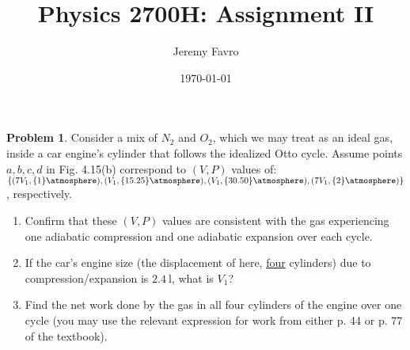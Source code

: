 \documentclass[10pt]{article}
\title{Physics 2700H: Assignment II}
\author{Jeremy Favro}
\date{\today}
\theoremstyle{definition}
\newtheorem{problem}{Problem}
\begin{document}
\maketitle

\begin{problem}
Consider a mix of $N_2$ and $O_2$, which we may treat as an ideal gas, inside a car engine's cylinder that
follows the idealized Otto cycle. Assume points ${a,b,c,d}$ in Fig. 4.15(b)
correspond to $(V,P)$ values of: $\left\{(7V_1,\qty{1}{\atmosphere}), (V_1, \qty{15.25}{\atmosphere}), (V_1, \qty{30.50}{\atmosphere}), (7V_1, \qty{2}{\atmosphere})\right\}$,
respectively.
\begin{enumerate}[label=(\alph*)]
  \item Confirm that these $(V,P)$ values are consistent with the gas experiencing one adiabatic
        compression and one adiabatic expansion over each cycle.
  \item If the car's engine size (the displacement of here, \underline{four} cylinders) due to compression/expansion is $\qty{2.4}{\litre}$, what is $V_1$?
  \item Find the net work done by the gas in all four cylinders of the engine over one cycle (you may use the relevant expression for work from either p. 44 or p. 77 of the textbook).
\end{enumerate}
\end{problem}
\end{document}
